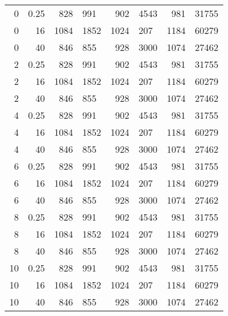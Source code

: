 \begin{tabular}{
rr
r@{$\pm$}l 
r@{$\pm$}l 
r@{$\pm$}l 
}

  0      &     0.25      &    828       & 991      &    902      &   4543      & 981      &  31755     \\ 
  0      &     16      &   1084       & 1852      &   1024      &    207      & 1184      &  60279     \\ 
  0      &     40      &    846       & 855      &    928      &   3000      & 1074      &  27462     \\ 
  2      &      0.25      &    828       & 991      &    902      &   4543      & 981      &  31755     \\ 
  2      &     16         &   1084       & 1852      &   1024      &    207      & 1184      &  60279     \\ 
  2      &     40         &    846       & 855      &    928      &   3000      & 1074      &  27462     \\ 
  4      &      0.25      &    828       & 991      &    902      &   4543      & 981      &  31755     \\ 
  4      &     16         &   1084       & 1852      &   1024      &    207      & 1184      &  60279     \\ 
  4      &     40         &    846       & 855      &    928      &   3000      & 1074      &  27462     \\ 
  6      &      0.25      &    828       & 991      &    902      &   4543      & 981      &  31755     \\ 
  6      &     16         &   1084       & 1852      &   1024      &    207      & 1184      &  60279     \\ 
  6      &     40         &    846       & 855      &    928      &   3000      & 1074      &  27462     \\ 
  8      &      0.25      &    828       & 991      &    902      &   4543      & 981      &  31755     \\ 
  8      &     16         &   1084       & 1852      &   1024      &    207      & 1184      &  60279     \\ 
  8      &     40         &    846       & 855      &    928      &   3000      & 1074      &  27462     \\ 
  10     &      0.25      &    828       & 991      &    902      &   4543      & 981      &  31755     \\ 
  10     &     16         &   1084       & 1852      &   1024      &    207      & 1184      &  60279     \\ 
  10     &     40         &    846       & 855      &    928      &   3000      & 1074      &  27462     \\ 
 \end{tabular}
